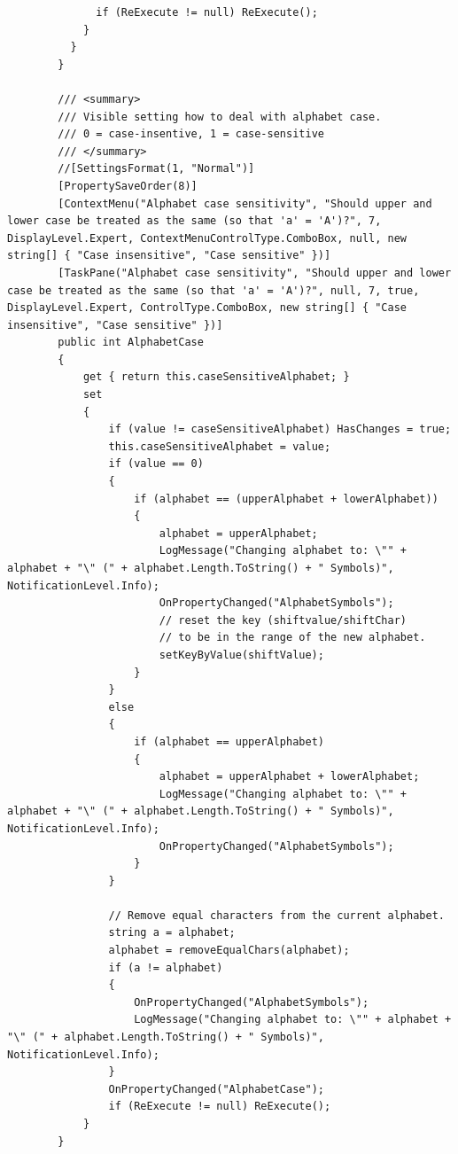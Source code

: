 \begin{lstlisting}
              if (ReExecute != null) ReExecute();
            }
          }
        }

        /// <summary>
        /// Visible setting how to deal with alphabet case.
        /// 0 = case-insentive, 1 = case-sensitive
        /// </summary>
        //[SettingsFormat(1, "Normal")]
        [PropertySaveOrder(8)]
        [ContextMenu("Alphabet case sensitivity", "Should upper and lower case be treated as the same (so that 'a' = 'A')?", 7, DisplayLevel.Expert, ContextMenuControlType.ComboBox, null, new string[] { "Case insensitive", "Case sensitive" })]
        [TaskPane("Alphabet case sensitivity", "Should upper and lower case be treated as the same (so that 'a' = 'A')?", null, 7, true, DisplayLevel.Expert, ControlType.ComboBox, new string[] { "Case insensitive", "Case sensitive" })]
        public int AlphabetCase
        {
            get { return this.caseSensitiveAlphabet; }
            set
            {
                if (value != caseSensitiveAlphabet) HasChanges = true;
                this.caseSensitiveAlphabet = value;
                if (value == 0)
                {
                    if (alphabet == (upperAlphabet + lowerAlphabet))
                    {
                        alphabet = upperAlphabet;
                        LogMessage("Changing alphabet to: \"" + alphabet + "\" (" + alphabet.Length.ToString() + " Symbols)", NotificationLevel.Info);
                        OnPropertyChanged("AlphabetSymbols");
                        // reset the key (shiftvalue/shiftChar)
                        // to be in the range of the new alphabet.
                        setKeyByValue(shiftValue);
                    }
                }
                else
                {
                    if (alphabet == upperAlphabet)
                    {
                        alphabet = upperAlphabet + lowerAlphabet;
                        LogMessage("Changing alphabet to: \"" + alphabet + "\" (" + alphabet.Length.ToString() + " Symbols)", NotificationLevel.Info);
                        OnPropertyChanged("AlphabetSymbols");
                    }
                }

                // Remove equal characters from the current alphabet.
                string a = alphabet;
                alphabet = removeEqualChars(alphabet);
                if (a != alphabet)
                {
                    OnPropertyChanged("AlphabetSymbols");
                    LogMessage("Changing alphabet to: \"" + alphabet + "\" (" + alphabet.Length.ToString() + " Symbols)", NotificationLevel.Info);
                }
                OnPropertyChanged("AlphabetCase");
                if (ReExecute != null) ReExecute();
            }
        }


\end{lstlisting}
